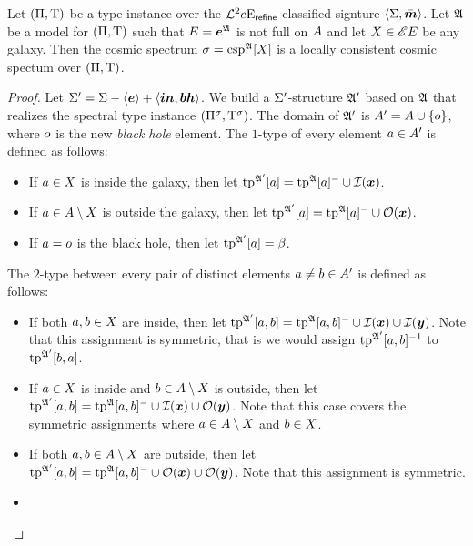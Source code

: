 \begin{remark}\label{rem:csp-is-locally-consistent}
Let $(\Pi,\mathrm{T})$ be a type instance over the
$\mathcal{L}^{2}{e}\mathrm{E}_{\mathsf{refine}}$-classified signture $\left\langle \mathrm{\Sigma},\bar{\bm{m}} \right\rangle$.
Let $\mathfrak{A}$ be a model for $(\Pi,\mathrm{T})$ such that $E =
\bm{e}^{\mathfrak{A}}$ is not full on $A$ and let $X \in {\mathscr{E}E}$ be any galaxy.
Then the cosmic spectrum $\sigma = \operatorname{csp}^{\mathfrak{A}}[X]$ is a locally consistent
cosmic spectum over $(\Pi,\mathrm{T})$.
\end{remark}
\begin{proof}
Let $\mathrm{\Sigma'} = \mathrm{\Sigma} - \left\langle \bm{e} \right\rangle + \left\langle \bm{in},\bm{bh} \right\rangle$.
We build a $\mathrm{\Sigma'}$-structure $\mathfrak{A'}$ based on $\mathfrak{A}$ that realizes the
spectral type instance $(\Pi^{\sigma},\mathrm{T}^{\sigma})$.
The domain of $\mathfrak{A'}$ is 
$A' = A \cup \left\{o\right\}$, where $o$ is the new \emph{black hole}
element.
The $1$-type of every element $a \in A'$ is defined as follows:
\begin{itemize}
  \item[\refsticondI]
  If $a \in X$ is inside the galaxy, then let
  $\operatorname{tp}^{\mathfrak{A'}}[a] = \operatorname{tp}^{\mathfrak{A}}[a]^{-} \cup \mathcal{I}(\bm{x})$.
  \item[\refsticondO]
  If $a \in A \setminus X$ is outside the galaxy, then let
  $\operatorname{tp}^{\mathfrak{A'}}[a] = \operatorname{tp}^{\mathfrak{A}}[a]^{-} \cup \mathcal{O}(\bm{x})$.
  \item[\refsticondB] If $a = o$ is the black hole, then let
  $\operatorname{tp}^{\mathfrak{A'}}[a] = \beta$.
\end{itemize}
The $2$-type between every pair of distinct elements $a \neq b \in A'$
is defined as follows:
\begin{itemize}
  \item[\refsticondII]
  If both $a,b \in X$ are inside, then let
  $\operatorname{tp}^{\mathfrak{A'}}[a,b] = \operatorname{tp}^{\mathfrak{A}}[a,b]^{-} \cup \mathcal{I}(\bm{x}) \cup \mathcal{I}(\bm{y})$.
  Note that this assignment is symmetric, that is we would assign
  $\operatorname{tp}^{\mathfrak{A'}}[a,b]^{-1}$ to $\operatorname{tp}^{\mathfrak{A'}}[b,a]$.
  \item[\refsticondIO]
  If $a \in X$ is inside and $b \in A \setminus
  X$ is outside, then let
  $\operatorname{tp}^{\mathfrak{A'}}[a,b] = \operatorname{tp}^{\mathfrak{A}}[a,b]^{-} \cup \mathcal{I}(\bm{x}) \cup \mathcal{O}(\bm{y})$.
  Note that this case covers the symmetric assignments where $a \in
  A\setminus X$ and $b \in X$.
  \item[\refsticondOO]
  If both $a, b \in A\setminus X$ are outside, then let
  $\operatorname{tp}^{\mathfrak{A'}}[a,b] = \operatorname{tp}^{\mathfrak{A}}[a,b]^{-} \cup \mathcal{O}(\bm{x}) \cup
  \mathcal{O}(\bm{y})$. Note that this assignment is symmetric.
  \item[\refsticondIB]

\end{itemize}
\end{proof}
